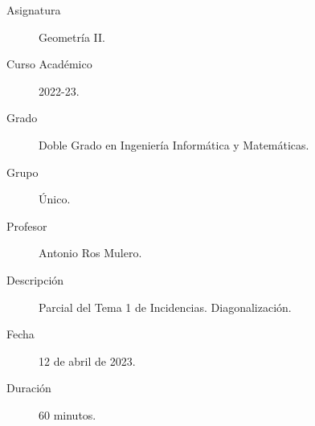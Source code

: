 \documentclass[12pt]{article}
\begin{document}

    
    

    \begin{description}
        \item[Asignatura] Geometría II.
        \item[Curso Académico] 2022-23.
        \item[Grado] Doble Grado en Ingeniería Informática y Matemáticas.
        \item[Grupo] Único.
        \item[Profesor] Antonio Ros Mulero.
        \item[Descripción] Parcial del Tema 1 de Incidencias. Diagonalización.
        \item[Fecha] 12 de abril de 2023.
        \item[Duración] 60 minutos.
    
    \end{description}
    \newpage
    
\end{document}
